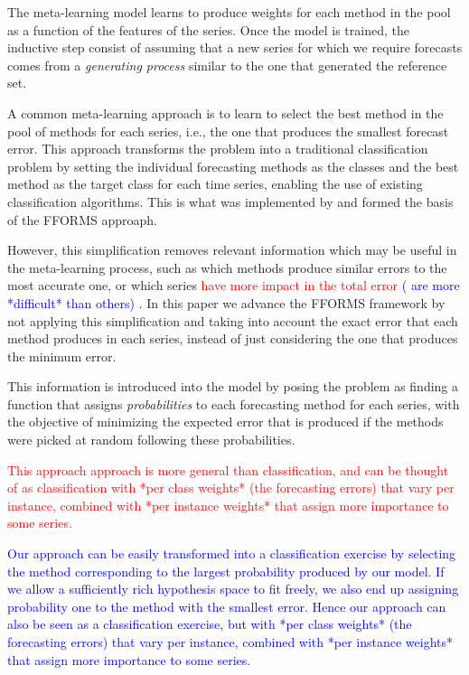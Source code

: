 \documentclass[11pt,a4paper,]{article}
\theoremstyle{definition}
\theoremstyle{definition}
\theoremstyle{definition}
\theoremstyle{remark}
\begin{document}
The meta-learning model learns to produce weights for each method in the
pool as a function of the features of the series. Once the model is
trained, the inductive step consist of assuming that a new series for
which we require forecasts comes from a \emph{generating process}
similar to the one that generated the reference set.

A common meta-learning approach is to learn to select the best method in
the pool of methods for each series, i.e., the one that produces the
smallest forecast error. This approach transforms the problem into a
traditional classification problem by setting the individual forecasting
methods as the classes and the best method as the target class for each
time series, enabling the use of existing classification algorithms.
This is what was implemented by \textcite{fforms} and formed the basis
of the FFORMS approaph.

However, this simplification removes relevant information which may be
useful in the meta-learning process, such as which methods produce
similar errors to the most accurate one, or which series
\textcolor{red}{ have more impact in the total error}
\textcolor{blue}{( are more *difficult* than others)}
.
In this paper we advance the FFORMS framework by not applying this
simplification and taking into account the exact error that each method
produces in each series, instead of just considering the one that
produces the minimum error.

This information is introduced into the model by posing the problem as
finding a function that assigns \emph{probabilities} to each forecasting
method for each series, with the objective of minimizing the expected
error that is produced if the methods were picked at random following
these probabilities.

\textcolor{red}{This approach approach is more general than classification, and can be thought of as classification  with *per class weights* (the forecasting errors) that vary per instance, combined with *per instance weights* that assign more importance to some series.}

\textcolor{blue}{
Our approach can be easily transformed into a classification exercise by selecting the method corresponding to the largest probability produced by our model. If we allow a sufficiently rich hypothesis space to fit freely, we also end up assigning probability one to the method with the smallest error. Hence our approach can also be seen as a classification exercise, but with *per class weights* (the forecasting errors) that vary per instance, combined with *per instance weights* that assign more importance to some series.}
\end{document}
